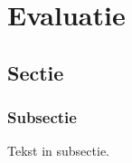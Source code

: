 \chapter{Evaluatie} \label{hoofdstuk:evaluatie}
\section{Sectie}
\subsection{Subsectie}
Tekst in subsectie.